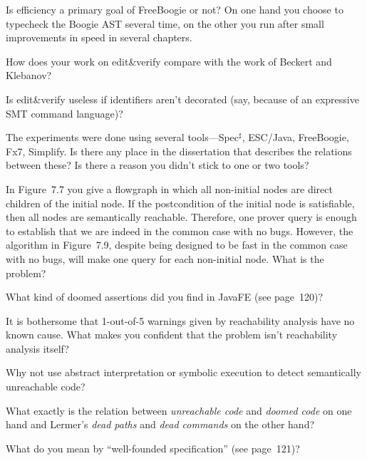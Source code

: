 \Q Is efficiency a primary goal of FreeBoogie or not? On one hand you choose
to typecheck the Boogie AST several time, on the other you run after small
improvements in speed in several chapters.


\Q How does your work on edit\&verify compare with the work of Beckert and
Klebanov?

\Q Is edit\&verify useless if identifiers aren't decorated (say, because of
an expressive SMT command language)?

\Q The experiments were done using several tools---Spec$^\sharp$, ESC/Java,
FreeBoogie, Fx7, Simplify. Is there any place in the dissertation that
describes the relations between these? Is there a reason you didn't stick
to one or two tools?

\Q In Figure~7.7 you give a flowgraph in which all non-initial nodes are
direct children of the initial node. If the postcondition of the initial
node is satisfiable, then all nodes are semantically reachable. Therefore,
one prover query is enough to establish that we are indeed in the common
case with no bugs. However, the algorithm in Figure~7.9, despite being
designed to be fast in the common case with no bugs, will make one query
for each non-initial node. What is the problem?


\Q What kind of doomed assertions did you find in JavaFE (see page~120)?

\Q It is bothersome that 1-out-of-5 warnings given by reachability analysis
have no known cause. What makes you confident that the problem isn't
reachability analysis itself?

\Q Why not use abstract interpretation or symbolic execution to detect
semantically unreachable code?


\Q What exactly is the relation between {\it unreachable code\/} and {\it
doomed code\/} on one hand and Lermer's {\it dead paths\/} and {\it dead
commands\/} on the other hand?

\Q What do you mean by ``well-founded specification'' (see page~121)?

\bye
